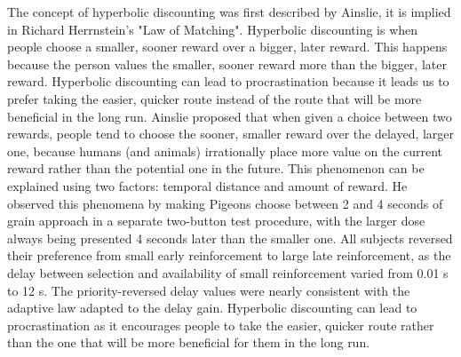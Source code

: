 The concept of  hyperbolic discounting was first described by Ainslie, it is
implied in Richard Herrnstein's "Law of Matching".
Hyperbolic discounting is when people choose a smaller, sooner reward over a bigger, later reward. This happens because the person values the smaller, sooner reward more than the bigger, later reward. Hyperbolic discounting can lead to procrastination because it leads us to prefer taking the easier, quicker route instead of the route that will be more beneficial in the long run.
Ainslie proposed that when given a choice between two rewards, people tend to choose the sooner, smaller reward over the delayed, larger one, because humans (and animals) irrationally place more value on the current reward rather than the potential one in the future.
This phenomenon can be explained using two factors: temporal distance and amount of reward.
He observed this phenomena by making Pigeons choose between 2 and 4 seconds of grain approach in a separate two-button test procedure, with the larger dose always being presented 4 seconds later than the smaller one. All subjects reversed their preference from small early reinforcement to large late reinforcement, as the delay between selection and availability of small reinforcement varied from 0.01 s to 12 s. The priority-reversed delay values ​​were nearly consistent with the adaptive law adapted to the delay gain.
Hyperbolic discounting can lead to procrastination as it encourages people to take the easier, quicker route rather than the one that will be more beneficial for them in the long run.
\cite{Ainslie1981Dec}



